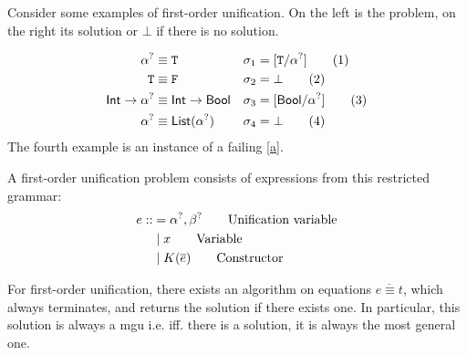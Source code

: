 \documentclass[twoside,12pt,a4paper]{article}
\begin{document}
Consider some examples of first-order unification. On the left is the problem, on the right its solution or $\bot$ if there is no solution.
\begin{example}
    \begin{align*}
        \alpha^? &\equiv \mathtt{T} &\sigma_1 &= [\mathtt{T}/\alpha^?]\tag{1}\\
        \mathtt{T} &\equiv \mathtt{F} &\sigma_2 &= \bot\tag{2}\\
        \mathsf{Int} \rightarrow \alpha^? &\equiv \mathsf{Int} \rightarrow \mathsf{Bool} &\sigma_3 &= [\mathsf{Bool}/\alpha^?]\tag{3}\\
        \alpha^?&\equiv \mathsf{List(\alpha^?)} &\sigma_4 &= \bot\tag{4}
    \end{align*}
    The fourth example is an instance of a failing \ref{a}.
\end{example}

\begin{definition}
    A first-order unification problem consists of expressions from this restricted grammar:
\begin{align*}
    e ::&= \alpha^?, \beta^? \tag*{Unification variable}\\
    &\;|\; x\tag*{Variable} \\
    &\;|\; K(\overline{e}) \tag*{Constructor}
\end{align*}
\end{definition}

\begin{theorem}
    For first-order unification, there exists an algorithm on equations $\overline{e\equiv t}$, which always terminates, and returns the solution if there exists one. 
    In particular, this solution is always a mgu i.e. iff. there is a solution, it is always the most general one.
\end{theorem}%
\end{document}
